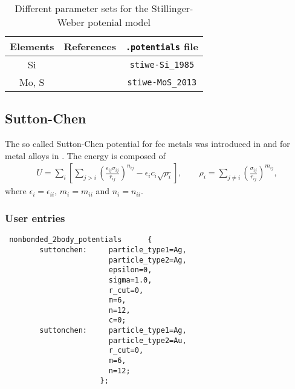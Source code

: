 \begin{table}
  \caption{Different parameter sets for the Stillinger-Weber potenial model}
  \label{tab:SuttonChen}
  \begin{center}
    \begin{tabular}{ccc}
      Elements & References & \texttt{.potentials} file \\\hline
      Si  & \cite{stillinger} & \verb+stiwe-Si_1985+\\\hline
      Mo, S & \cite{jiang2013molecular} & \verb+stiwe-MoS_2013+\\\hline
    \end{tabular}
  \end{center}
\end{table}

\subsection{Sutton-Chen}
The so called Sutton-Chen potential for fcc metals was introduced in \cite{sutton1990long} and for metal alloys in \cite{rafii1991long}.
The energy is composed of
\begin{align*}
  U = \sum_i \left[\sum_{j> i} \left( \frac{\epsilon_{ij}\sigma_{ij}} {r_{ij}}\right)^{n_{ij}} -\epsilon_{i}c_i\sqrt{\rho_i}\right] , \qquad \rho_i=\sum_{j\neq i} \left(\frac{\sigma_{ij}} {r_{ij}}\right)^{m_{ij}},
\end{align*}
where $\epsilon_i = \epsilon_{ii}$, $m_i = m_{ii}$ and $n_i = n_{ii}$.
\subsubsection{User entries}
\begin{lstlisting}
 nonbonded_2body_potentials      {
        suttonchen:     particle_type1=Ag,
                        particle_type2=Ag,
                        epsilon=0,
                        sigma=1.0,
                        r_cut=0,
                        m=6,
                        n=12,
                        c=0;
        suttonchen:     particle_type1=Ag,
                        particle_type2=Au,
                        r_cut=0,
                        m=6,
                        n=12;
                      };
\end{lstlisting}

